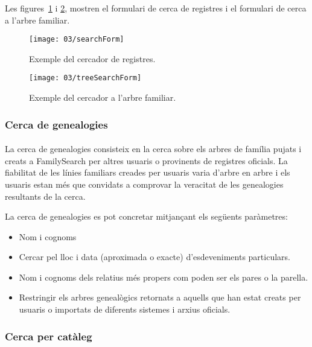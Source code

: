         Les figures~\ref{fig:fsSearcher} i \ref{fig:treeSearcher}, mostren el formulari de cerca de registres i el formulari de cerca a l'arbre familiar.

        \begin{figure}[h]
            \texttt{[image: 03/searchForm]}
            \centering
            \caption{Exemple del cercador de registres.\label{fig:fsSearcher}}
        \end{figure}

        \begin{figure}[h]
            \texttt{[image: 03/treeSearchForm]}
            \centering
            \caption{Exemple del cercador a l'arbre familiar.\label{fig:treeSearcher}}
        \end{figure}


    \subsubsection{Cerca de genealogies}

        \paragraph{}
        La cerca de genealogies consisteix en la cerca sobre els arbres de família pujats i creats a FamilySearch per altres usuaris o provinents de registres oficials. La fiabilitat de les línies familiars creades per usuaris varia d’arbre en arbre i els usuaris estan més que convidats a comprovar la veracitat de les genealogies resultants de la cerca.

        La cerca de genealogies es pot concretar mitjançant els següents paràmetres:

        \begin{itemize}
            \item Nom i cognoms
            \item Cercar pel lloc i data (aproximada o exacte) d’esdeveniments particulars.
            \item Nom i cognoms dels relatius més propers com poden ser els pares o la parella.
            \item Restringir els arbres genealògics retornats a aquells que han estat creats per usuaris o importats de diferents sistemes i arxius oficials.
        \end{itemize}


    \subsubsection{Cerca per catàleg}

